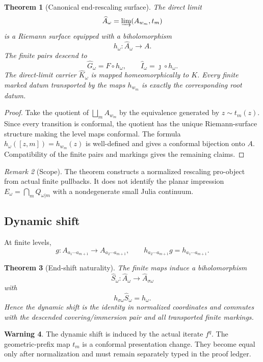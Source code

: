 \documentclass[11pt]{article}
\newtheorem{theorem}{Theorem}[section]
\theoremstyle{definition}
\newtheorem{warning}[theorem]{Warning}
\theoremstyle{remark}
\newtheorem{remark}[theorem]{Remark}
\begin{document}
\begin{theorem}[Canonical end-rescaling surface]
The direct limit
\[
 \widehat A_\omega=\varinjlim(A_{w_m},t_m)
\]
is a Riemann surface equipped with a biholomorphism
\[
 h_\omega:\widehat A_\omega\to A.
\]
The finite pairs descend to
\[
 \widehat G_\omega=F\circ h_\omega,
 \qquad
 \widehat I_\omega=\jmath\circ h_\omega.
\]
The direct-limit carrier $\widehat K_\omega$ is mapped homeomorphically to
$K$.  Every finite marked datum transported by the maps $h_{w_m}$ is exactly
the corresponding root datum.
\end{theorem}

\begin{proof}
Take the quotient of $\bigsqcup_m A_{w_m}$ by the equivalence generated by
$z\sim t_m(z)$.  Since every transition is conformal, the quotient has the
unique Riemann-surface structure making the level maps conformal.  The formula
$h_\omega([z,m])=h_{w_m}(z)$ is well-defined and gives a conformal bijection
onto $A$.  Compatibility of the finite pairs and markings gives the remaining
claims.
\end{proof}

\begin{remark}[Scope]
The theorem constructs a normalized rescaling pro-object from actual finite
pullbacks.  It does not identify the planar impression
$E_\omega=\bigcap_mQ_{\omega|m}$ with a nondegenerate small Julia continuum.
\end{remark}

\subsection{Dynamic shift}
At finite levels,
\[
 g:A_{a_1\cdots a_{m+1}}\to A_{a_2\cdots a_{m+1}},\qquad
 h_{a_2\cdots a_{m+1}}g=h_{a_1\cdots a_{m+1}}.
\]

\begin{theorem}[End-shift naturality]
The finite maps induce a biholomorphism
\[
 \widehat S_\omega:\widehat A_\omega\to\widehat A_{\sigma\omega}
\]
with
\[
 h_{\sigma\omega}\widehat S_\omega=h_\omega.
\]
Hence the dynamic shift is the identity in normalized coordinates and commutes
with the descended covering/immersion pair and all transported finite markings.
\end{theorem}

\begin{warning}
The dynamic shift is induced by the actual iterate $f^q$.  The geometric-prefix
map $t_m$ is a conformal presentation change.  They become equal only after
normalization and must remain separately typed in the proof ledger.
\end{warning}
\end{document}
